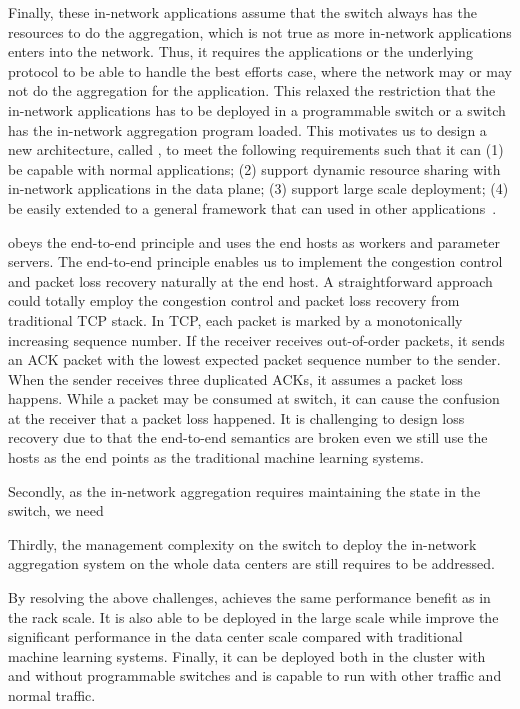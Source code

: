 Finally, these in-network applications assume that the switch always has the resources to do the aggregation,
which is not true as more in-network applications enters into the network. Thus, it requires the applications or
the underlying protocol to be able to handle the best efforts case, where the network may or may not do the 
aggregation for the application. This relaxed the restriction that the in-network applications has to be deployed 
in a programmable switch or a switch has the in-network aggregation program loaded.   
\fi 
This motivates us to design a new architecture, called \system, to meet the following requirements such that it can (1) be capable with normal applications; (2) support dynamic resource sharing with in-network applications in the data plane;
(3) support large scale deployment; (4) be easily extended to a general framework that can used in other applications~. 

\system obeys the end-to-end principle and uses the end hosts as workers and parameter servers. 
The end-to-end principle enables us to implement the congestion control and packet loss recovery 
naturally at the end host. A straightforward approach could totally employ 
the congestion control and packet loss recovery from traditional TCP stack.
In TCP, each packet is marked by a monotonically increasing sequence number. 
If the receiver receives out-of-order packets, it sends an ACK packet with the lowest 
expected packet sequence number to the sender. 
When the sender receives three duplicated ACKs, it assumes a packet loss happens.
While a packet may be consumed at switch, it can cause the confusion at the receiver
that a packet loss happened. It is challenging to design loss recovery due to that the end-to-end semantics are broken even we still use the hosts as the end points as the traditional machine learning systems. 
 
Secondly, as the in-network aggregation requires maintaining the state in the switch, 
we need 

Thirdly, the management complexity on the switch to deploy 
the in-network aggregation system on the whole data centers 
are still requires to be addressed.



By resolving the above challenges, \system achieves the same performance benefit 
as \switchml in the rack scale. 
It is also able to be deployed in the large scale while improve the significant 
performance in the data center scale compared with traditional machine learning systems. 
Finally, it can be deployed both in the cluster with and without 
programmable switches and is capable to run with other \system traffic and normal traffic. 

